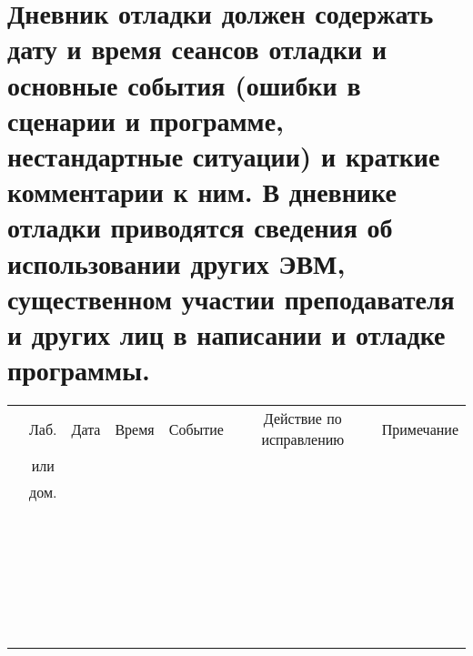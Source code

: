 \section{Дневник отладки \textnormal{\small должен содержать дату и время сеансов отладки и основные события (ошибки в сценарии и программе,
    \singlespace нестандартные ситуации) и краткие комментарии к ним. В дневнике отладки приводятся сведения об использовании других ЭВМ,
    \singlespace существенном участии преподавателя и других лиц в написании и отладке программы.}}

\begin{table}[!h]
  \begin{tabular}{|c|c|c|c|c|c|c|}
    \hline
    \textnumero{} & Лаб. & Дата & Время & \hspace{1cm} Событие \hspace{1cm} &\quad Действие по исправлению \quad & \hspace{1cm} Примечание \hspace{1cm} \\
                  & или & & & & & \\
                  & дом. & & & & & \\
    \hline
                  & & & & & & \\
                  & & & & & & \\
                  & & & & & & \\
                  & & & & & & \\
                  & & & & & & \\
                  & & & & & & \\
                  & & & & & & \\
                  & & & & & & \\
                  & & & & & & \\
                  & & & & & & \\
                  & & & & & & \\
                  & & & & & & \\
                  & & & & & & \\
                  & & & & & & \\
                  & & & & & & \\
                  & & & & & & \\
                  & & & & & & \\
                  & & & & & & \\
                  & & & & & & \\
                  & & & & & & \\
                  & & & & & & \\
                  & & & & & & \\
                  & & & & & & \\
                  & & & & & & \\
                  & & & & & & \\
                  & & & & & & \\
    \hline
  \end{tabular}
\end{table}


